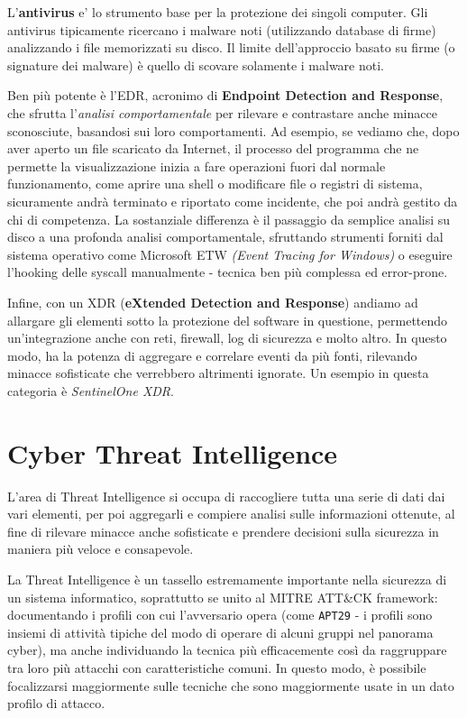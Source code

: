 L'\textbf{antivirus} e' lo strumento base per la protezione dei singoli computer. Gli antivirus tipicamente ricercano i malware noti (utilizzando database di firme) analizzando i file memorizzati su disco. Il limite dell'approccio basato su firme (o signature dei malware) è quello di scovare solamente i malware noti. 

Ben più potente è l'EDR, acronimo di \textbf{Endpoint Detection and Response}, che sfrutta l'\emph{analisi comportamentale} per rilevare e contrastare anche minacce sconosciute, basandosi sui loro comportamenti. Ad esempio, se vediamo che, dopo aver aperto un file scaricato da Internet, il processo del programma che ne permette la visualizzazione inizia a fare operazioni fuori dal normale funzionamento, come aprire una shell o modificare file o registri di sistema, sicuramente andrà terminato e riportato come incidente, che poi andrà gestito da chi di competenza.
La sostanziale differenza è il passaggio da semplice analisi su disco a una profonda analisi comportamentale, sfruttando strumenti forniti dal sistema operativo come Microsoft ETW \emph{(Event Tracing for Windows)} o eseguire l'hooking delle syscall manualmente - tecnica ben più complessa ed error-prone.

Infine, con un XDR (\textbf{eXtended Detection and Response}) andiamo ad allargare gli elementi sotto la protezione del software in questione, permettendo un'integrazione anche con reti, firewall, log di sicurezza e molto altro.
In questo modo, ha la potenza di aggregare e correlare eventi da più fonti, rilevando minacce sofisticate che verrebbero altrimenti ignorate.
Un esempio in questa categoria è \emph{SentinelOne XDR}.

\section{Cyber Threat Intelligence}
\label{chap:cyber_threat_intelligence}
L'area di Threat Intelligence si occupa di raccogliere tutta una serie di dati dai vari elementi,
per poi aggregarli e compiere analisi sulle informazioni ottenute, al fine di rilevare minacce anche sofisticate e prendere decisioni sulla sicurezza in maniera più veloce e consapevole.

La Threat Intelligence è un tassello estremamente importante nella sicurezza di un sistema informatico, soprattutto se unito al MITRE ATT\&CK framework: documentando i profili con cui l'avversario opera (come \texttt{APT29} - i profili sono insiemi di attività tipiche del modo di operare di alcuni gruppi nel panorama cyber), ma anche individuando la tecnica più efficacemente così da raggruppare tra loro più attacchi con caratteristiche comuni.
In questo modo, è possibile focalizzarsi maggiormente sulle tecniche che sono maggiormente usate in un dato profilo di attacco.

